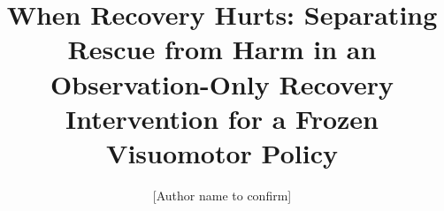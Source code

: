 \documentclass[preprint,12pt]{elsarticle}
\begin{document}
\begin{frontmatter}

\title{When Recovery Hurts: Separating Rescue from Harm in an Observation-Only Recovery Intervention for a Frozen Visuomotor Policy}

\author[1]{[Author name to confirm]}





\end{frontmatter}


















\end{document}
